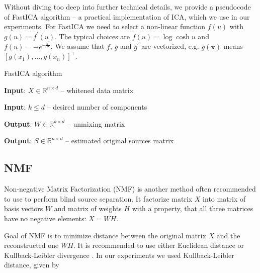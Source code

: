 \documentclass[../main.tex]{subfiles} %
\begin{document}
Without diving too deep into further technical details, we provide a pseudocode of FastICA algorithm \cite{ica,fastica} -- a practical implementation of ICA, which we use in our experiments. For FastICA we need to select a non-linear function $f(u)$ with $g(u) = f^\prime(u)$. The typical choices are $f(u) = \log\cosh u$ and $f(u) = - e^{-\frac{u^2}{2}}$. We assume that $f$, $g$ and $g^\prime$ are vectorized, e.g. $g(\mathbf{x})$ means $\left[ g(x_1), \ldots, g(x_n) \right]^\top$.

\begin{algorithm} 
	\begin{algorithmic}
		\caption{FastICA algorithm}\label{fastica}
		\item \textbf{Input}: $X \in \mathbb{R}^{n \times d}$ -- whitened data matrix
		\item \textbf{Input}: $k \le d$ -- desired number of components
		\item \textbf{Output}: $W \in \mathbb{R}^{k \times d}$ -- unmixing matrix
		\item \textbf{Output}: $S \in \mathbb{R}^{n \times d}$ -- estimated original sources matrix
		
		 
		 
		 
		\EndWhile
		\EndFor
		\EndFunction
	\end{algorithmic}
\end{algorithm}

\subsection{NMF}

Non-negative Matrix Factorization (NMF) \cite{nmf} is another method often recommended to use to perform blind source separation. It factorize matrix $X$ into matrix of basis vectors $W$ and matrix of weights $H$ with a property, that all three matrices have no negative elements: $X = W H$.

Goal of NMF is to minimize distance between the original matrix $X$ and the reconstructed one $W H$. It is recommended to use either Euclidean distance or Kullback-Leibler divergence \cite{nmf_tutorial}. In our experiments we used Kullback-Leibler distance, given by
\end{document}
